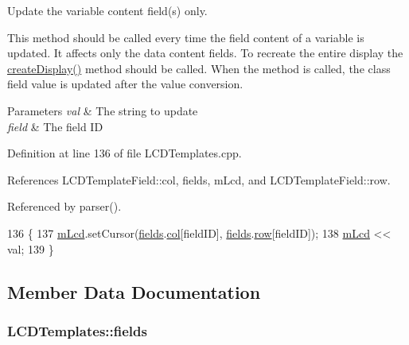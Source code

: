 Update the variable content field(s) only. 

This method should be called every time the field content of a variable is updated. It affects only the data content fields. To recreate the entire display the \hyperlink{class_l_c_d_templates_a26e2851456f4a2e41b1a57221a29e652}{create\-Display()} method should be called. When the method is called, the class field value is updated after the value conversion.


\begin{DoxyParams}{Parameters}
{\em val} & The string to update \\
\hline
{\em field} & The field I\-D \\
\hline
\end{DoxyParams}


Definition at line 136 of file L\-C\-D\-Templates.\-cpp.



References L\-C\-D\-Template\-Field\-::col, fields, m\-Lcd, and L\-C\-D\-Template\-Field\-::row.



Referenced by parser().


\begin{DoxyCode}
136                                                         \{
137   \hyperlink{class_l_c_d_templates_a92a2475558ce15aa8a311c36705788fd}{mLcd}.setCursor(\hyperlink{class_l_c_d_templates_a804bf1c0e5530bc8f685c52aace5519e}{fields}.\hyperlink{struct_l_c_d_template_field_acf04ebae1e6cd326e3b4237cb73bb23d}{col}[fieldID], \hyperlink{class_l_c_d_templates_a804bf1c0e5530bc8f685c52aace5519e}{fields}.\hyperlink{struct_l_c_d_template_field_a8c1f20c4249d9b0e338609e89499216e}{row}[fieldID]);
138   \hyperlink{class_l_c_d_templates_a92a2475558ce15aa8a311c36705788fd}{mLcd} << val;
139 \}
\end{DoxyCode}


\subsection{Member Data Documentation}
\hypertarget{class_l_c_d_templates_a804bf1c0e5530bc8f685c52aace5519e}{
\subsubsection[{fields}]{ L\-C\-D\-Templates\-::fields}}\label{class_l_c_d_templates_a804bf1c0e5530bc8f685c52aace5519e}


